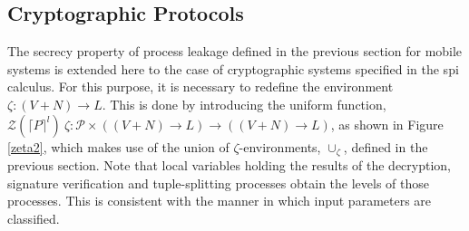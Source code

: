 \documentclass[10pt,a4paper,final,oneside,fleqn]{book}
\begin{document}
\subsection{Cryptographic Protocols\label{sect:procleakspi}}
The secrecy property of process leakage defined in the previous section for mobile systems is extended here to the case of cryptographic systems specified in the spi calculus. For this purpose, it is necessary to redefine the environment $\zeta:(V+N)\to L$. This is done by introducing the uniform function, $\mathcal{Z}(\lceil P\rceil^l)~\zeta:\mathcal{P}\times((V+N)\to L)\to((V+N)\to L)$, as shown in Figure \ref{zeta2}, which makes use of the union of $\zeta$-environments, $\cup_\zeta$, defined in the previous section. Note that local variables holding the results of the decryption, signature verification and tuple-splitting processes obtain the levels of those processes. This is consistent with the manner in which input parameters are classified.
\end{document}
